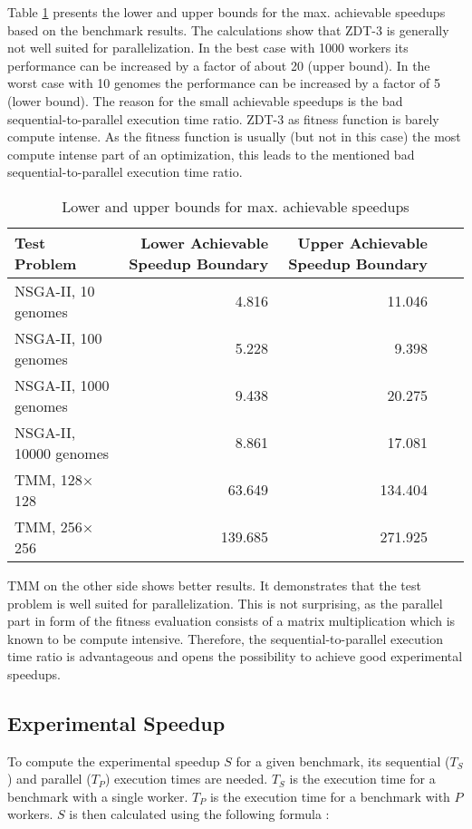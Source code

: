 Table \ref{table:achievable_speedups} presents the lower and upper bounds for the max. achievable speedups based on the benchmark results. The calculations show that ZDT-3 is generally not well suited for parallelization. In the best case with 1000 workers its performance can be increased by a factor of about 20 (upper bound). In the worst case with 10 genomes the performance can be increased by a factor of 5 (lower bound). The reason for the small achievable speedups is the bad sequential-to-parallel execution time ratio. ZDT-3 as fitness function is barely compute intense. As the fitness function is usually (but not in this case) the most compute intense part of an optimization, this leads to the mentioned bad sequential-to-parallel execution time ratio.

\begin{table}
  \centering
  \caption{Lower and upper bounds for max. achievable speedups}
  \begin{tabular}{lrrrr}\toprule[2pt]
    Test Problem & \parbox[r]{3.5cm}{Lower Achievable Speedup Boundary}& \parbox[r]{3.5cm}{Upper Achievable Speedup Boundary}\\ \midrule
    NSGA-II, 10 genomes & 4.816 & 11.046 \\
    NSGA-II, 100 genomes & 5.228 & 9.398 \\
    NSGA-II, 1000 genomes & 9.438 & 20.275 \\
    NSGA-II, 10000 genomes & 8.861 & 17.081 \\
    TMM, 128$\times$128 & 63.649 & 134.404 \\
    TMM, 256$\times$256 & 139.685 & 271.925 \\ \bottomrule[2pt]
  \end{tabular}
  \label{table:achievable_speedups}
\end{table}

TMM on the other side shows better results. It demonstrates that the test problem is well suited for parallelization. This is not surprising, as the parallel part in form of the fitness evaluation consists of a matrix multiplication which is known to be compute intensive. Therefore, the sequential-to-parallel execution time ratio is advantageous and opens the possibility to achieve good experimental speedups.

\subsection{Experimental Speedup}
\label{chap:evaluation:exp_speedup}
To compute the experimental speedup $S$ for a given benchmark, its sequential ($T_S$) and parallel ($T_P$) execution times are needed. $T_S$ is the execution time for a benchmark with a single worker. $T_P$ is the execution time for a benchmark with $P$ workers. $S$ is then calculated using the following formula \cite{hennessy2012computer}:

